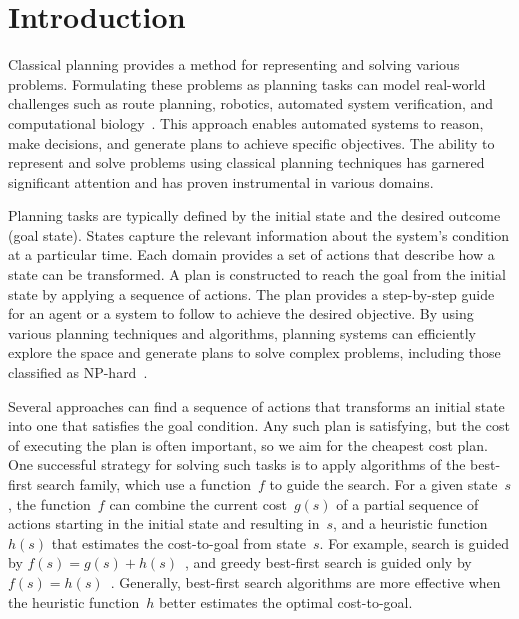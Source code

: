 \chapter{Introduction}
\label{sec:intro}

Classical planning provides a method for representing and solving various problems. Formulating these problems as planning tasks can model real-world challenges such as route planning, robotics, automated system verification, and computational biology~\cite{Edelkamp.etal/2012}. This approach enables automated systems to reason, make decisions, and generate plans to achieve specific objectives. The ability to represent and solve problems using classical planning techniques has garnered significant attention and has proven instrumental in various domains.

Planning tasks are typically defined by the initial state and the desired outcome (goal state). States capture the relevant information about the system's condition at a particular time. Each domain provides a set of actions that describe how a state can be transformed. A plan is constructed to reach the goal from the initial state by applying a sequence of actions. The plan provides a step-by-step guide for an agent or a system to follow to achieve the desired objective. By using various planning techniques and algorithms, planning systems can efficiently explore the space and generate plans to solve complex problems, including those classified as NP-hard~\cite{bylander1994computational}.

Several approaches can find a sequence of actions that transforms an initial state into one that satisfies the goal condition. Any such plan is satisfying, but the cost of executing the plan is often important, so we aim for the cheapest cost plan. One successful strategy for solving such tasks is to apply algorithms of the best-first search family, which use a function~$f$ to guide the search. For a given state~$s$, the function~$f$ can combine the current cost~$g(s)$ of a partial sequence of actions starting in the initial state and resulting in~$s$, and a heuristic function~$h(s)$ that estimates the cost-to-goal from state~$s$. For example, \astar search is guided by $f(s)=g(s)+h(s)$~\cite{hart-et-al-ieeessc1968}, and greedy best-first search is guided only by $f(s)=h(s)$~\cite{doran-michie-rsl1966}. Generally, best-first search algorithms are more effective when the heuristic function~$h$ better estimates the optimal cost-to-goal.

